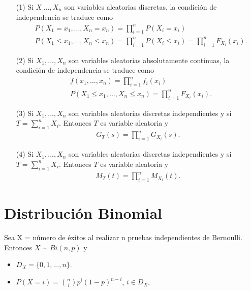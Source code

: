 \begin{obs}
    \begin{enumerate}
        \item[(1)] Si $X_,...,X_n$ son variables aleatorias discretas, la condición de independencia se traduce como
              \begin{align*}
                   & P(X_1 = x_1, ..., X_n = x_n) = \prod_{i=1}^{n}{P(X_i = x_i)}                                         \\
                   & P(X_1 \leq x_1,...,X_n \leq x_n) = \prod_{i=1}^{n}{P(X_i \leq x_i)} = \prod_{i=1}^{n}{F_{X_i}(x_i)}.
              \end{align*}
        \item[(2)] Si $X_1,...,X_n$ son variables aleatorias absolutamente continuas, la condición de independencia se traduce como
              \begin{align*}
                   & f(x_1,...,x_n) = \prod_{i=1}^{n}{f_i(x_i)}                        \\
                   & P(X_1 \leq x_1,...,X_n \leq x_n) = \prod_{i=1}^{n}{F_{X_i}(x_i)}.
              \end{align*}
        \item[(3)] Si $X_1,...,X_n$ son variables aleatorias discretas independientes y si $T = \sum_{i=1}^{n}{X_i}$. Entonces $T$ es variable aleatoria y
              \begin{align*}
                  G_T(s) = \prod_{i=1}^{n}{G_{X_i}(s)}.
              \end{align*}
        \item[(4)] Si $X_1,...,X_n$ son variables aleatorias discretas independientes y si $T = \sum_{i=1}^{n}{X_i}$. Entonces $T$ es variable aleatoria y
              \begin{align*}
                  M_T(t) = \prod_{i=1}^{n}{M_{X_i}(t)}.
              \end{align*}
    \end{enumerate}
\end{obs}

\section{Distribución Binomial}

\begin{defi}
    Sea X = número de éxitos al realizar n pruebas independientes de Bernoulli. Entonces $X \sim Bi(n,p)$ y
    \begin{itemize}
        \item $D_X = \{0,1,...,n\}$.
        \item $P(X = i) = \binom{n}{i}p^i(1-p)^{n-i}$, $i \in D_X$.
    \end{itemize}
\end{defi}

